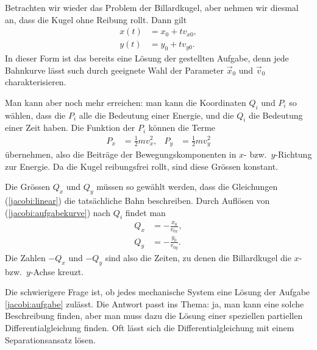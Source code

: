 \begin{beispiel}
Betrachten wir wieder das Problem der Billardkugel, aber nehmen wir
diesmal an, dass die Kugel ohne Reibung rollt. Dann gilt
\begin{equation}
\begin{aligned}
x(t)&=x_0 + tv_{x0},\\
y(t)&=y_0 + tv_{y0}.
\end{aligned}
\label{jacobi:linear}
\end{equation}
In dieser Form ist das bereits eine Lösung der gestellten Aufgabe,
denn jede Bahnkurve lässt such durch geeignete Wahl der
Parameter $\vec x_0$ und $\vec v_0$ charakterisieren.

Man kann aber noch mehr erreichen: man kann die Koordinaten $Q_i$ und $P_i$
so wählen, dass die $P_i$ alle die Bedeutung einer Energie,
und die $Q_i$ die Bedeutung einer Zeit haben.
Die Funktion der $P_i$ können die Terme
\begin{equation*}
\begin{aligned}
P_x&=\frac12mv_x^2,&
P_y&=\frac12mv_y^2
\end{aligned}
\end{equation*}
übernehmen, also die Beiträge der Bewegungskomponenten in $x$-
bzw.~$y$-Richtung zur Energie. Da die Kugel reibungsfrei rollt, sind
diese Grössen konstant.

Die Grössen $Q_x$ und $Q_y$ müssen so gewählt werden, dass 
die Gleichungen (\ref{jacobi:linear}) die tatsächliche Bahn beschreiben.
Durch Auflösen von (\ref{jacobi:aufgabekurve}) nach $Q_i$ findet man
\begin{equation*}
\begin{aligned}
Q_x&=-\frac{x_0}{v_{0x}},\\
Q_y&=-\frac{y_0}{v_{0y}}.
\end{aligned}
\end{equation*}
Die Zahlen $-Q_x$ und $-Q_y$ sind also die Zeiten, zu denen die
Billardkugel die $x$- bzw.~$y$-Achse kreuzt.
\end{beispiel}

Die schwierigere Frage ist, ob jedes mechanische System eine
Lösung der Aufgabe \ref{jacobi:aufgabe} zulässt.
Die Antwort passt ins Thema: ja, man kann eine solche Beschreibung
finden, aber man muss dazu die Lösung einer speziellen
partiellen Differentialgleichung finden. Oft lässt sich die
Differentialgleichung mit einem Separationsansatz lösen.

